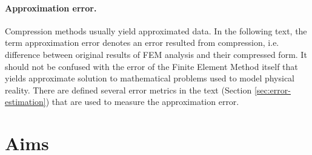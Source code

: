 \paragraph{Approximation error.} Compression methods usually yield approximated data. In the following text, the term approximation error denotes an error resulted from compression, i.e. difference between original results of FEM analysis and their compressed form. It should not be confused with the error of the Finite Element Method itself that yields approximate solution to mathematical problems used to model physical reality. There are defined several error metrics in the text (Section \ref{sec:error-estimation}) that are used to measure the approximation error.




\section{Aims} %

